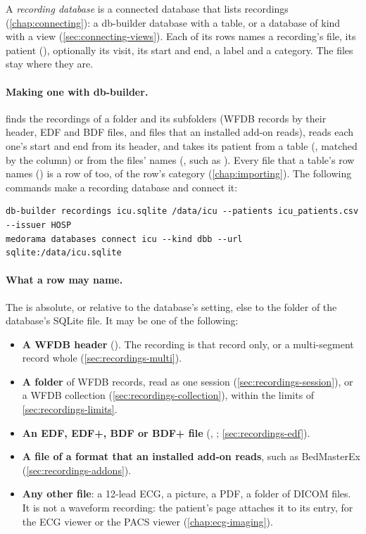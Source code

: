 A \emph{recording database} is a connected database that lists recordings
(\cref{chap:connecting}): a db-builder database with a  table, or a database of
kind  with a  view (\cref{sec:connecting-views}). Each of its rows
names a recording's file, its patient (), optionally its visit, its start and
end, a label and a category. The files stay where they are.

\paragraph{Making one with db-builder.}  finds the
recordings of a folder and its subfolders (WFDB records by their header, EDF and BDF files, and
files that an installed add-on reads), reads each one's start and end from its header, and takes
its patient from a table (, matched by the  column) or from
the files' names (, such as ). Every file that a
table's row names () is a row of  too, of the row's category
(\cref{chap:importing}). The following commands make a recording database and connect it:
\begin{lstlisting}[style=shell]
db-builder recordings icu.sqlite /data/icu --patients icu_patients.csv --issuer HOSP
medorama databases connect icu --kind dbb --url sqlite:/data/icu.sqlite
\end{lstlisting}

\paragraph{What a row may name.} The  is absolute, or relative to the database's
 setting, else to the folder of the database's SQLite file. It may be one of the
following:
\begin{itemize}
\item \textbf{A WFDB header} (). The recording is that record only, or a
  multi-segment record whole (\cref{sec:recordings-multi}).
\item \textbf{A folder} of WFDB records, read as one session (\cref{sec:recordings-session}), or
  a WFDB collection (\cref{sec:recordings-collection}), within the limits of
  \cref{sec:recordings-limits}.
\item \textbf{An EDF, EDF+, BDF or BDF+ file} (, ;
  \cref{sec:recordings-edf}).
\item \textbf{A file of a format that an installed add-on reads}, such as BedMasterEx
   (\cref{sec:recordings-addons}).
\item \textbf{Any other file}: a 12-lead ECG, a picture, a PDF, a folder of DICOM files. It is
  not a waveform recording: the patient's page attaches it to its entry, for the ECG viewer or
  the PACS viewer (\cref{chap:ecg-imaging}).
\end{itemize}

